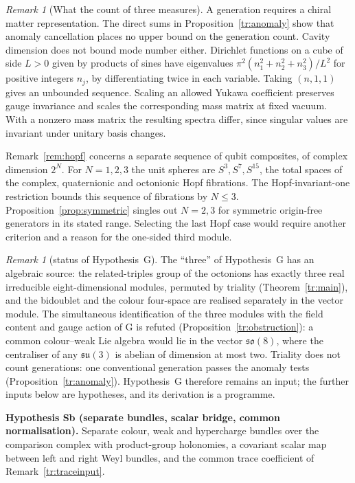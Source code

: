 \documentclass[aps,pra,onecolumn,superscriptaddress,nofootinbib,10pt]{revtex4-2}
\theoremstyle{definition}
\theoremstyle{remark}
\newtheorem{remark}[theorem]{Remark}
\begin{document}
\begin{remark}[What the count of three measures]\label{tr:multiplicity}
A generation requires a chiral matter representation. The direct
sums in Proposition~\ref{tr:anomaly} show that anomaly cancellation
places no upper bound on the generation count. Cavity dimension
does not bound mode number either. Dirichlet functions on a cube
of side \(L>0\) given by products of sines have eigenvalues
\(\pi^2(n_1^2+n_2^2+n_3^2)/L^2\) for positive integers \(n_j\),
by differentiating twice in each variable. Taking \((n,1,1)\)
gives an unbounded sequence. Scaling an allowed Yukawa coefficient
preserves gauge invariance and scales the corresponding mass
matrix at fixed vacuum. With a nonzero mass matrix the resulting
spectra differ, since singular values are invariant under unitary
basis changes.

Remark~\ref{rem:hopf} concerns a separate sequence of qubit
composites, of complex dimension \(2^N\). For \(N=1,2,3\)
the unit spheres are \(S^3,S^7,S^{15}\), the total spaces of
the complex, quaternionic and octonionic Hopf fibrations.
The Hopf-invariant-one restriction \cite{Adams} bounds this
sequence of fibrations by \(N\leq3\).
Proposition~\ref{prop:symmetric} singles out \(N=2,3\) for
symmetric origin-free generators in its stated range.
Selecting the last Hopf case would require another criterion
and a reason for the one-sided third module.
\end{remark}

\begin{remark}[status of Hypothesis~G]\label{rem:trstatus}
The ``three'' of Hypothesis~G has an algebraic source: the related-triples group of the octonions has exactly
three real irreducible eight-dimensional modules, permuted by triality (Theorem~\ref{tr:main}), and the
bidoublet and the colour four-space are realised separately in the vector module.  The simultaneous
identification of the three modules with the field content and gauge action of G is refuted
(Proposition~\ref{tr:obstruction}): a common colour--weak Lie algebra would lie in the vector $\mathfrak{so}(8)$, where
the centraliser of any $\mathfrak{su}(3)$ is abelian of dimension at most two.  Triality does not count generations:
one conventional generation passes the anomaly tests (Proposition~\ref{tr:anomaly}).  Hypothesis~G therefore
remains an input; the further inputs below are hypotheses, and its derivation is a programme.
\end{remark}

\smallskip\noindent\textbf{Hypothesis Sb (separate bundles, scalar bridge, common normalisation).}  Separate colour, weak and
hypercharge bundles over the comparison complex with product-group holonomies, a covariant scalar map
between left and right Weyl bundles, and the common trace coefficient of Remark~\ref{tr:traceinput}.
\end{document}
